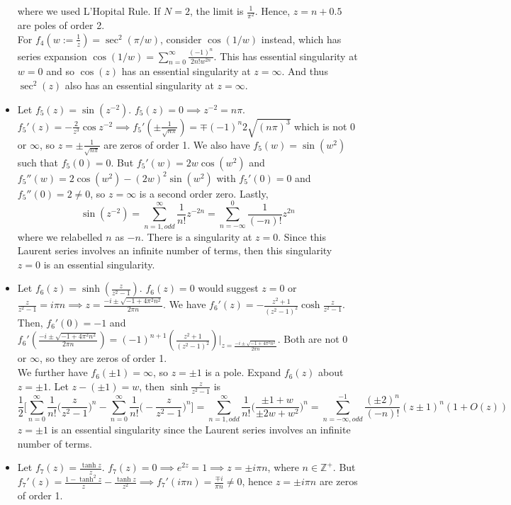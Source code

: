 \documentclass[a4paper]{article}
\begin{document}
\begin{ans}
\begin{itemize}
    where we used L'Hopital Rule. If $N=2$, the limit is $\frac{1}{\pi^2}$. Hence, $z=n+0.5$ are poles of order 2.\\[5pt]
    For $f_4(w:=\frac{1}{z})=\sec^2(\pi/w)$, consider $\cos(1/w)$ instead, which has series expansion $\cos(1/w)=\sum_{n=0}^\infty\frac{(-1)^n}{2n!w^{2n}}$. This has essential singularity at $w=0$ and so $\cos(z)$ has an essential singularity at $z=\infty$. And thus $\sec^2(z)$ also has an essential singularity at $z=\infty$.
    \item Let $f_5(z)=\sin(z^{-2})$. $f_5(z)=0\implies z^{-2}=n\pi$. $f_5'(z)=-\frac{2}{z^3}\cos z^{-2}\implies f_5'(\pm\frac{1}{\sqrt{n\pi}})=\mp(-1)^n2\sqrt{(n\pi)^3}$ which is not 0 or $\infty$, so $z=\pm\frac{1}{\sqrt{n\pi}}$ are zeros of order 1. We also have $f_5(w)=\sin(w^2)$ such that $f_5(0)=0$. But $f_5'(w)=2w\cos(w^2)$ and $f_5''(w)=2\cos(w^2)-(2w)^2\sin(w^2)$ with $f_5'(0)=0$ and $f_5''(0)=2\neq 0$, so $z=\infty$ is a second order zero. Lastly,
    $$\sin(z^{-2})=\sum_{n=1,odd}^\infty\frac{1}{n!}z^{-2n}=\sum_{n=-\infty}^0\frac{1}{(-n)!}z^{2n}$$
    where we relabelled $n$ as $-n$. There is a singularity at $z=0$. Since this Laurent series involves an infinite number of terms, then this singularity $z=0$ is an essential singularity.
    \item Let $f_6(z)=\sinh(\frac{z}{z^2-1})$. $f_6(z)=0$ would suggest $z=0$ or $\frac{z}{z^2-1}=i\pi n\implies z=\frac{-i\pm\sqrt{-1+4\pi^2n^2}}{2\pi n}$. We have $f_6'(z)=-\frac{z^2+1}{(z^2-1)^2}\cosh\frac{z}{z^2-1}$. Then, $f_6'(0)=-1$ and $f_6'(\frac{-i\pm\sqrt{-1+4\pi^2n^2}}{2\pi n})=(-1)^{n+1}(\frac{z^2+1}{(z^2-1)^2})|_{z=\frac{-i\pm\sqrt{-1+4\pi^2n^2}}{2\pi n}}$. Both are not 0 or $\infty$, so they are zeros of order 1.\\[5pt]
    We further have $f_6(\pm1)=\infty$, so $z=\pm1$ is a pole. Expand $f_6(z)$ about $z=\pm1$. Let $z-(\pm 1)=w$, then $\sinh\frac{z}{z^2-1}$ is
    $$\frac{1}{2}\bigg[\sum_{n=0}^\infty\frac{1}{n!}\bigg(\frac{z}{z^2-1}\bigg)^n-\sum_{n=0}^\infty\frac{1}{n!}\bigg(-\frac{z}{z^2-1}\bigg)^n\bigg]=\sum_{n=1,odd}^\infty\frac{1}{n!}\bigg(\frac{\pm 1+w}{\pm 2w+w^2}\bigg)^n=\sum_{n=-\infty,odd}^{-1}\frac{(\pm 2)^n}{(-n)!}(z\pm1)^n(1+O(z))$$
    $z=\pm 1$ is an essential singularity since the Laurent series involves an infinite number of terms.
    \item Let $f_7(z)=\frac{\tanh z}{z}$. $f_7(z)=0\implies e^{2z}=1\implies z=\pm i\pi n$, where $n\in\mathbb{Z}^+$. But $f_7'(z)=\frac{1-\tanh^2z}{z}-\frac{\tanh z}{z^2}\implies f_7'(i\pi n)=\frac{\mp i}{\pi n}\neq 0$, hence $z=\pm i\pi n$ are zeros of order 1.\\[5pt]

\end{itemize}
\end{ans}
\end{document}
